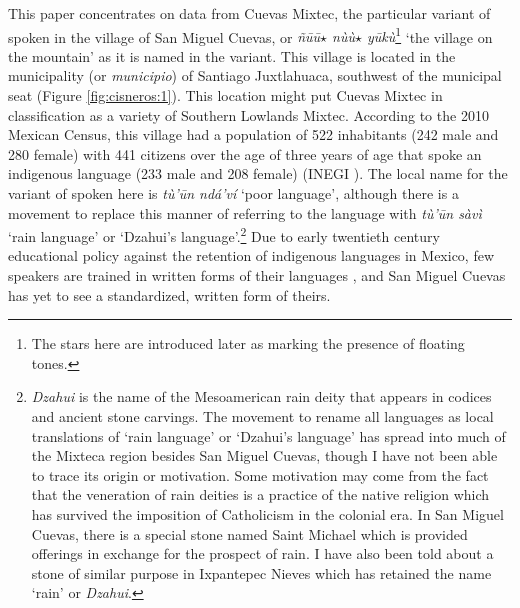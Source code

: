 \documentclass[output=paper,modfonts,nonflat]{langsci/langscibook}
\begin{document}
This paper concentrates on data from Cuevas Mixtec, the particular variant of  spoken in the village of San Miguel Cuevas, or \textit{\~n\=u\=u$\star$ n\`u\`u$\star$ y\=uk\`u}\footnote{The stars here are introduced later as marking the presence of floating tones.} `the village on the mountain' as it is named in the variant.  This village is located in the municipality (or \textit{municipio}) of Santiago Juxtlahuaca, southwest of the municipal seat (Figure \ref{fig:cisneros:1}).  This location might put Cuevas Mixtec in  classification as a variety of Southern Lowlands Mixtec.  According to the 2010 Mexican Census, this village had a population of 522 inhabitants (242 male and 280 female) with 441 citizens over the age of three years of age that spoke an indigenous language (233 male and 208 female) (INEGI \citeyear{inegi2010}).  The local name for the variant of  spoken here is \textit{t\`u'\=un nd\'a'v\'i} `poor language', although there is a movement to replace this manner of referring to the language with \textit{t\`u'\=un s\`av\`i} `rain language' or `Dzahui's language'.\footnote{\textit{Dzahui} is the name of the Mesoamerican rain deity that appears in  codices and ancient stone carvings.  The movement to rename all  languages as local translations of `rain language' or `Dzahui's language' has spread into much of the Mixteca region besides San Miguel Cuevas, though I have not been able to trace its origin or motivation.  Some motivation may come from the fact that the veneration of rain deities is a practice of the native  religion which has survived the imposition of Catholicism in the colonial era.  In San Miguel Cuevas, there is a special stone named Saint Michael which is provided offerings in exchange for the prospect of rain.  I have also been told about a stone of similar purpose in Ixpantepec Nieves which has retained the name `rain' or \textit{Dzahui}.}  Due to early twentieth century educational policy against the retention of indigenous languages in Mexico, few  speakers are trained in written forms of their languages \citep[29]{VelascoOrtiz2005}, and San Miguel Cuevas has yet to see a standardized, written form of theirs.
\end{document}
